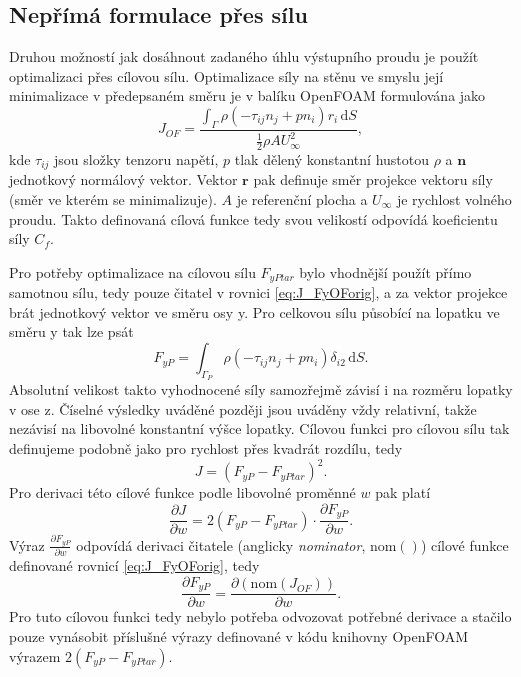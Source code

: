 \subsection{Nepřímá formulace přes sílu}

Druhou možností jak dosáhnout zadaného úhlu výstupního proudu je použít optimalizaci přes cílovou sílu. 
Optimalizace síly na stěnu ve smyslu její minimalizace v předepsaném směru je v balíku OpenFOAM formulována jako
\begin{equation}\label{eq:J_FyOForig}
J_{OF}=\dfrac{\int_\Gamma \rho (-\tau_{ij}n_j+pn_i)r_i\,\mathrm{d}S}{\frac{1}{2}\rho A U_{\infty}^2},
\end{equation}
kde $ \tau_{ij} $ jsou složky tenzoru napětí, $ p $ tlak dělený konstantní hustotou $ \rho $ a $ \mathbf{n} $ jednotkový normálový vektor. Vektor $ \mathbf{r} $ pak definuje směr projekce vektoru síly (směr ve kterém se minimalizuje). $ A $ je referenční plocha a $ U_{\infty} $ je rychlost volného proudu. Takto definovaná cílová funkce tedy svou velikostí odpovídá koeficientu síly $ C_f $.

Pro potřeby optimalizace na cílovou sílu $ F_{yPtar} $ bylo vhodnější použít přímo samotnou sílu, tedy pouze čitatel v rovnici \ref{eq:J_FyOForig}, a za vektor projekce brát jednotkový vektor ve směru osy y. Pro celkovou sílu působící na lopatku ve směru y tak lze psát
\begin{equation}
F_{yP}=\int_{\Gamma_P} \rho (-\tau_{ij}n_j+pn_i)\delta_{i2}\,\mathrm{d}S.
\end{equation}
Absolutní velikost takto vyhodnocené síly samozřejmě závisí i na rozměru lopatky v ose z. Číselné výsledky uváděné později jsou uváděny vždy relativní, takže nezávisí na libovolné konstantní výšce lopatky. Cílovou funkci pro cílovou sílu tak definujeme podobně jako pro rychlost přes kvadrát rozdílu, tedy
\begin{equation}\label{eq:J_FyTarget}
J= (F_{yP} - F_{yPtar})^2.
\end{equation}
Pro derivaci této cílové funkce podle libovolné proměnné $ w $ pak platí
\begin{equation}
\dfrac{\partial J}{\partial w} = 
2(F_{yP}-F_{yPtar}) \cdot \dfrac{\partial F_{yP}}{\partial w}.
\end{equation}
Výraz $ \frac{\partial F_{yP}}{\partial w} $ odpovídá derivaci čitatele (anglicky \textit{nominator}, $ \mathrm{nom()} $) cílové funkce definované rovnicí \ref{eq:J_FyOForig}, tedy
\begin{equation}
\dfrac{\partial F_{yP}}{\partial w} = \dfrac{\partial (\mathrm{nom}(J_{OF}))}{\partial w}.
\end{equation}
Pro tuto cílovou funkci tedy nebylo potřeba odvozovat potřebné derivace a stačilo pouze vynásobit příslušné výrazy definované v kódu knihovny OpenFOAM výrazem $ 2(F_{yP}-F_{yPtar}) $.



